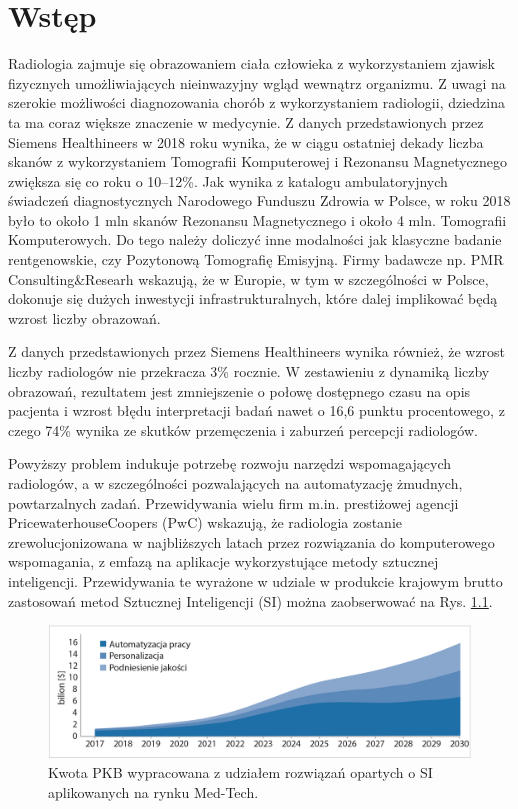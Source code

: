\chapter{Wstęp}

Radiologia zajmuje się obrazowaniem ciała człowieka z wykorzystaniem zjawisk fizycznych umożliwiających nieinwazyjny wgląd wewnątrz organizmu. Z uwagi na szerokie możliwości diagnozowania chorób z wykorzystaniem radiologii, dziedzina ta ma coraz większe znaczenie w medycynie. Z danych przedstawionych przez Siemens Healthineers w 2018 roku wynika, że w ciągu ostatniej dekady liczba skanów z wykorzystaniem Tomografii Komputerowej i Rezonansu Magnetycznego zwiększa się co roku o 10--12\%. Jak wynika z katalogu ambulatoryjnych świadczeń diagnostycznych Narodowego Funduszu Zdrowia w Polsce, w roku 2018 było to około 1 mln skanów Rezonansu Magnetycznego i około 4 mln. Tomografii Komputerowych. Do tego należy doliczyć inne modalności jak klasyczne badanie rentgenowskie, czy Pozytonową Tomografię Emisyjną. Firmy badawcze np. PMR Consulting\&Researh wskazują, że w Europie, w tym w szczególności w Polsce, dokonuje się dużych inwestycji infrastrukturalnych, które dalej implikować będą wzrost liczby obrazowań.
  
Z danych przedstawionych przez Siemens Healthineers wynika również, że wzrost liczby radiologów nie przekracza 3\% rocznie. W zestawieniu z dynamiką liczby obrazowań, rezultatem jest zmniejszenie o połowę dostępnego czasu na opis pacjenta i wzrost błędu interpretacji badań nawet o 16,6 punktu procentowego, z czego 74\% wynika ze skutków przemęczenia i zaburzeń percepcji radiologów.  

Powyższy problem indukuje potrzebę rozwoju narzędzi wspomagających radiologów, a w szczególności pozwalających na automatyzację żmudnych, powtarzalnych zadań. Przewidywania wielu firm m.in. prestiżowej agencji PricewaterhouseCoopers (PwC) wskazują, że radiologia zostanie zrewolucjonizowana w najbliższych latach przez rozwiązania do komputerowego wspomagania, z emfazą na aplikacje wykorzystujące metody sztucznej inteligencji. Przewidywania te wyrażone w udziale w produkcie krajowym brutto zastosowań metod Sztucznej Inteligencji (SI) można zaobserwować na Rys. \ref{MedTechGrowth}. 
\begin{figure}[h!]
	\centering
	\includegraphics[width=1.0\textwidth]{figures/AI_w_radiologii.jpg}
	\caption{Kwota PKB wypracowana z udziałem rozwiązań opartych o SI aplikowanych na rynku Med-Tech.}
	\label{MedTechGrowth}
\end{figure}

